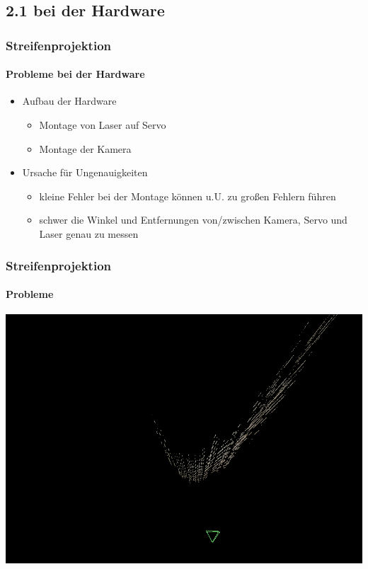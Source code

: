 \documentclass{beamer}
\begin{document}
\subsection{2.1 \hspace{5px} bei der Hardware}
\begin{frame}
	\frametitle{Streifenprojektion}
	\framesubtitle{Probleme bei der Hardware}

	\begin{itemize}
		\item Aufbau der Hardware
		\begin{itemize}
			\item Montage von Laser auf Servo
			\item Montage der Kamera
		\end{itemize}
		\item Ursache für Ungenauigkeiten
		\begin{itemize}
			\item kleine Fehler bei der Montage können u.U. zu großen Fehlern führen
			\item schwer die Winkel und Entfernungen von/zwischen Kamera, Servo und Laser genau zu messen 
		\end{itemize}
	\end{itemize}

\end{frame}

\begin{frame}
	\frametitle{Streifenprojektion}
	\framesubtitle{Probleme}

	\includegraphics[width=\linewidth]{includes/krumm.png}

\end{frame}
\end{document}
